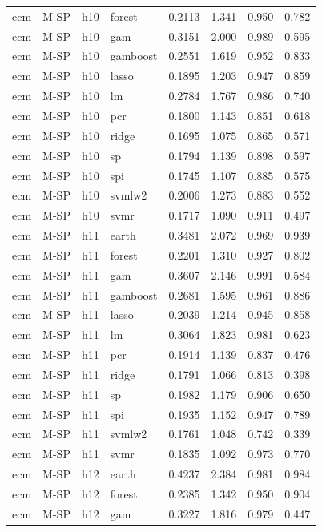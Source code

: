 \begin{ThreePartTable}
\begin{longtable}[t]{llclcccc}
ecm & M-SP & h10 & forest & 0.2113 & 1.341 & 0.950 & 0.782\\
ecm & M-SP & h10 & gam & 0.3151 & 2.000 & 0.989 & 0.595\\
ecm & M-SP & h10 & gamboost & 0.2551 & 1.619 & 0.952 & 0.833\\
ecm & M-SP & h10 & lasso & 0.1895 & 1.203 & 0.947 & 0.859\\
ecm & M-SP & h10 & lm & 0.2784 & 1.767 & 0.986 & 0.740\\
ecm & M-SP & h10 & pcr & 0.1800 & 1.143 & 0.851 & 0.618\\
ecm & M-SP & h10 & ridge & 0.1695 & 1.075 & 0.865 & 0.571\\
ecm & M-SP & h10 & sp & 0.1794 & 1.139 & 0.898 & 0.597\\
ecm & M-SP & h10 & spi & 0.1745 & 1.107 & 0.885 & 0.575\\
ecm & M-SP & h10 & svmlw2 & 0.2006 & 1.273 & 0.883 & 0.552\\
ecm & M-SP & h10 & svmr & 0.1717 & 1.090 & 0.911 & 0.497\\
\addlinespace
ecm & M-SP & h11 & earth & 0.3481 & 2.072 & 0.969 & 0.939\\
ecm & M-SP & h11 & forest & 0.2201 & 1.310 & 0.927 & 0.802\\
ecm & M-SP & h11 & gam & 0.3607 & 2.146 & 0.991 & 0.584\\
ecm & M-SP & h11 & gamboost & 0.2681 & 1.595 & 0.961 & 0.886\\
ecm & M-SP & h11 & lasso & 0.2039 & 1.214 & 0.945 & 0.858\\
ecm & M-SP & h11 & lm & 0.3064 & 1.823 & 0.981 & 0.623\\
ecm & M-SP & h11 & pcr & 0.1914 & 1.139 & 0.837 & 0.476\\
ecm & M-SP & h11 & ridge & 0.1791 & 1.066 & 0.813 & 0.398\\
ecm & M-SP & h11 & sp & 0.1982 & 1.179 & 0.906 & 0.650\\
ecm & M-SP & h11 & spi & 0.1935 & 1.152 & 0.947 & 0.789\\
ecm & M-SP & h11 & svmlw2 & 0.1761 & 1.048 & 0.742 & 0.339\\
ecm & M-SP & h11 & svmr & 0.1835 & 1.092 & 0.973 & 0.770\\
\addlinespace
ecm & M-SP & h12 & earth & 0.4237 & 2.384 & 0.981 & 0.984\\
ecm & M-SP & h12 & forest & 0.2385 & 1.342 & 0.950 & 0.904\\
ecm & M-SP & h12 & gam & 0.3227 & 1.816 & 0.979 & 0.447\\

\end{longtable}
\end{ThreePartTable}
